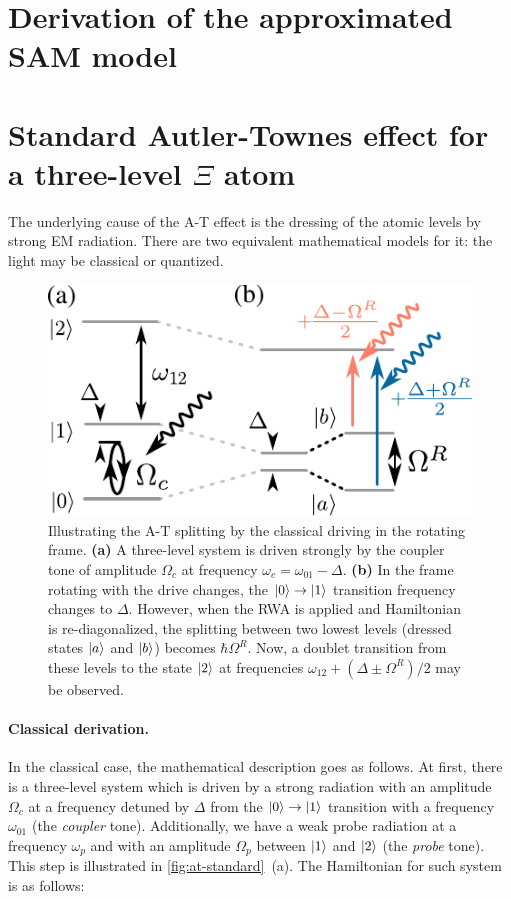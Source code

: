 \documentclass[%
 aps, prx,
 amsmath,amssymb,
 reprint,%
superscriptaddress
]{revtex4-2}
\begin{document}
\appendix

\section{Derivation of the approximated SAM model}

\section{Standard Autler-Townes effect for a three-level $\Xi$ atom} \label{sec:3-level-at}

The underlying cause of the A-T effect is the dressing of the atomic levels by strong EM radiation. There are two equivalent mathematical models for it: the light may be classical or quantized.

\begin{figure}[b]	
	\includegraphics[width=\linewidth]{intro_scheme}
	\caption{Illustrating the A-T splitting by  the classical driving in the rotating frame. \textbf{(a)} A three-level system is driven strongly by the coupler tone of amplitude $\Omega_c$ at frequency $\omega_c = \omega_{01}-\Delta$. \textbf{(b)} In the frame rotating with the drive changes, the $\ket{0}\rightarrow \ket{1}$ transition frequency changes to $\Delta$. However, when the RWA is applied and Hamiltonian is re-diagonalized, the splitting between two lowest levels (dressed states $\ket{a}$ and $\ket{b}$) becomes $\hbar \Omega^R$. Now, a doublet transition from these levels to the state $\ket{2}$ at frequencies $\omega_{12}+(\Delta \pm \Omega^R)/2$ may be observed.} 
	\label{fig:at-standard}
\end{figure}

\paragraph{Classical derivation.} In the classical case, the mathematical description goes as follows. At first, there is a three-level system which is driven by a strong radiation with an amplitude $\Omega_c$ at a frequency detuned by $\Delta$ from the $\ket{0}\rightarrow \ket{1}$ transition with a frequency $\omega_{01}$ (the \textit{coupler} tone). Additionally, we have a weak probe radiation at a frequency $\omega_{p}$ and with an amplitude $\Omega_p$ between $\ket{1}$ and $\ket{2}$ (the \textit{probe} tone). This step is illustrated in \autoref{fig:at-standard}~(a). The Hamiltonian for such system is as follows:
\end{document}
